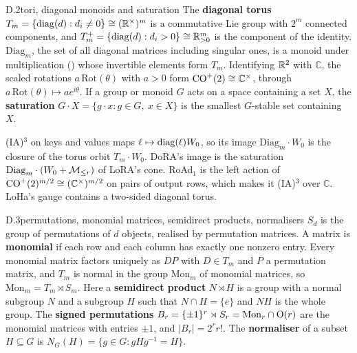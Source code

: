 
\begin{bgentry}{D.2}{tori, diagonal monoids and saturation}
The \textbf{diagonal torus} $T_m=\{\operatorname{diag}(d):d_i\ne0\}\cong(\mathbb{R}^\times)^m$ is a commutative Lie group with $2^m$ connected
components, and $T_m^+=\{\operatorname{diag}(d):d_i>0\}\cong\mathbb{R}_{>0}^m$ is the component of the identity. $\mathrm{Diag}_m$, the set of
all diagonal matrices including singular ones, is a monoid under multiplication () whose invertible elements
form $T_m$. Identifying $\mathbb{R}^2$ with $\mathbb C$, the scaled rotations $a\,\mathrm{Rot}(\theta)$ with $a>0$ form
$\mathrm{CO}^+(2)\cong\mathbb C^\times$, through $a\,\mathrm{Rot}(\theta)\mapsto ae^{i\theta}$. If a group or monoid $G$ acts on
a space containing a set $X$, the \textbf{saturation} $G\cdot X=\{g\cdot x:g\in G,\ x\in X\}$ is the smallest $G$-stable
set containing $X$.
\end{bgentry}

(IA)$^3$ \citep{liu2022few} on keys and values maps $\ell\mapsto\operatorname{diag}(\ell)W_0$, so its image $\mathrm{Diag}_m\cdot W_0$
is the closure of the torus orbit $T_m\cdot W_0$. DoRA's image is the saturation $\mathrm{Diag}_m\cdot(W_0+\mathcal{M}_{\le r})$ of
LoRA's cone. RoAd$_1$ \citep{liao20243} is the left action of $\mathrm{CO}^+(2)^{m/2}\cong(\mathbb C^\times)^{m/2}$ on pairs of
output rows, which makes it (IA)$^3$ over $\mathbb C$. LoHa's gauge contains a two-sided diagonal torus.


\begin{bgentry}{D.3}{permutations, monomial matrices, semidirect products, normalisers}
$S_d$ is the group of permutations of $d$ objects, realised by permutation matrices. A matrix is \textbf{monomial} if
each row and each column has exactly one nonzero entry. Every monomial matrix factors uniquely as $DP$ with $D\in T_m$
and $P$ a permutation matrix, and $T_m$ is normal in the group $\mathrm{Mon}_m$ of monomial matrices, so
$\mathrm{Mon}_m=T_m\rtimes S_m$. Here a \textbf{semidirect product} $N\rtimes H$ is a group with a normal subgroup $N$
and a subgroup $H$ such that $N\cap H=\{e\}$ and $NH$ is the whole group. The \textbf{signed permutations}
$B_r=\{\pm1\}^r\rtimes S_r=\mathrm{Mon}_r\cap\mathrm{O}(r)$ are the monomial matrices with entries $\pm1$, and $\lvert
B_r\rvert=2^rr!$. The \textbf{normaliser} of a subset $H\subseteq G$ is $N_G(H)=\{g\in G:gHg^{-1}=H\}$.
\end{bgentry}

